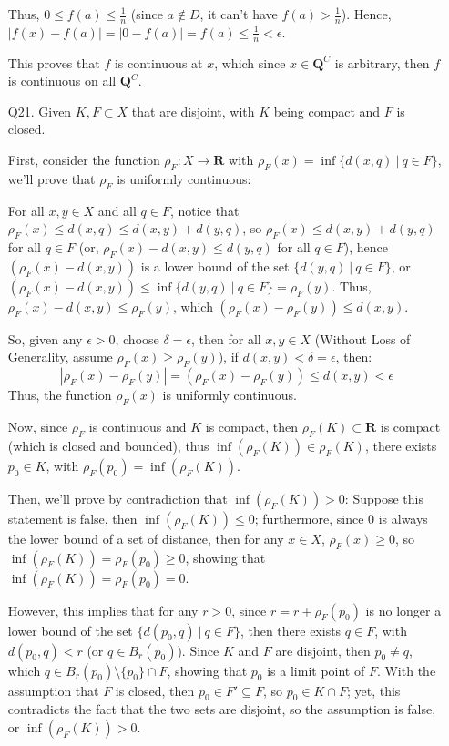 \documentclass{article}
\begin{document}
\begin{itemize}
    Thus, $0 \leq f(a) \leq \frac{1}{n}$ (since $a\notin D$, it can't have $f(a) > \frac{1}{n}$). Hence, $|f(x)-f(a)| = |0-f(a)| = f(a) \leq \frac{1}{n} < \epsilon$.

    This proves that $f$ is continuous at $x$, which since $x\in\mathbf{Q}^C$ is arbitrary, then $f$ is continuous on all $\mathbf{Q}^C$.
    
    \break

    \item[Q21.]
    Given $K,F\subset X$ that are disjoint, with $K$ being compact and $F$ is closed. 

    First, consider the function $\rho_F:X\rightarrow \mathbf{R}$ with $\rho_F(x) = \inf\{d(x,q)\ |\ q\in F\}$, we'll prove that $\rho_F$ is uniformly continuous:

    For all $x,y\in X$ and all $q\in F$, notice that $\rho_F(x) \leq d(x,q) \leq d(x,y) + d(y,q)$, so $\rho_F(x) \leq d(x,y)+d(y,q)$ for all $q\in F$ (or, $\rho_F(x)-d(x,y) \leq d(y,q)$ for all $q\in F$), hence $(\rho_F(x)-d(x,y))$ is a lower bound of the set $\{d(y,q)\ |\ q\in F\}$, or $(\rho_F(x)-d(x,y)) \leq \inf\{d(y,q)\ |\ q\in F\} = \rho_F(y)$. Thus, $\rho_F(x)-d(x,y) \leq \rho_F(y)$, which $(\rho_F(x)-\rho_F(y)) \leq d(x,y)$.

    So, given any $\epsilon>0$, choose $\delta = \epsilon$, then for all $x,y\in X$ (Without Loss of Generality, assume $\rho_F(x) \geq \rho_F(y)$), if $d(x,y)< \delta = \epsilon$, then:
    $$|\rho_F(x)-\rho_F(y)| = (\rho_F(x)-\rho_F(y)) \leq d(x,y) < \epsilon$$
    Thus, the function $\rho_F(x)$ is uniformly continuous.

    \hfill

    Now, since $\rho_F$ is continuous and $K$ is compact, then $\rho_F(K) \subset \mathbf{R}$ is compact (which is closed and bounded), thus $\inf(\rho_F(K)) \in \rho_F(K)$, there exists $p_0 \in K$, with $\rho_F(p_0) = \inf(\rho_F(K))$.

    Then, we'll prove by contradiction that $\inf(\rho_F(K)) >0$: Suppose this statement is false, then $\inf(\rho_F(K)) \leq 0$; furthermore, since $0$ is always the lower bound of a set of distance, then for any $x\in X$, $\rho_F(x) \geq 0$, so $\inf(\rho_F(K)) = \rho_F(p_0) \geq 0$, showing that $\inf(\rho_F(K)) = \rho_F(p_0) = 0$.

    However, this implies that for any $r>0$, since $r = r+\rho_F(p_0)$ is no longer a lower bound of the set $\{d(p_0,q)\ |\ q\in F\}$, then there exists $q\in F$, with $d(p_0,q) <r$ (or $q\in B_r(p_0)$). Since $K$ and $F$ are disjoint, then $p_0 \neq q$, which $q \in B_r(p_0) \setminus \{p_0\} \cap F$, showing that $p_0$ is a limit point of $F$. With the assumption that $F$ is closed, then $p_0 \in F' \subseteq F$, so $p_0 \in K\cap F$; yet, this contradicts the fact that the two sets are disjoint, so the assumption is false, or $\inf(\rho_F(K)) >0$.


\end{itemize}
\end{document}
